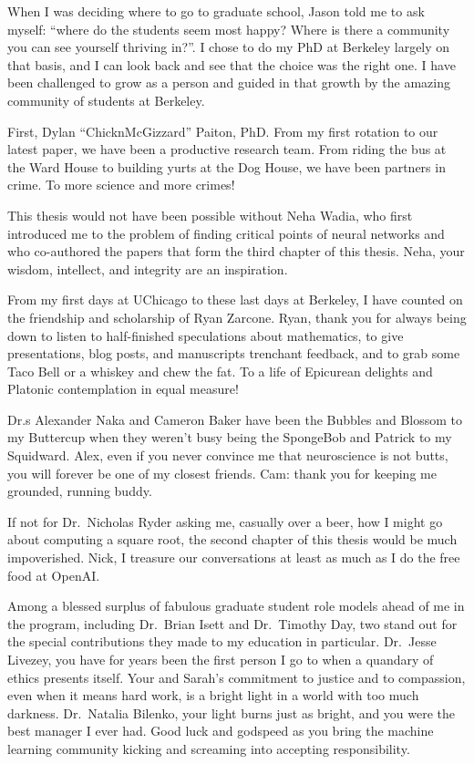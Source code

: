\begin{frontmatter}
\begin{acknowledgements}
	When I was deciding where to go to graduate school,
	Jason told me to ask myself:
	\enquote{where do the students seem most happy?
	Where is there a community you can see yourself thriving in?}.
	I chose to do my PhD at Berkeley largely on that basis,
	and I can look back and see that the choice was the right one.
	I have been challenged to grow as a person
	and guided in that growth by the amazing community
	of students at Berkeley.

	First, Dylan \enquote{ChicknMcGizzard} Paiton, PhD.
	From my first rotation to our latest paper,
	we have been a productive research team.
	From riding the bus at the Ward House
	to building yurts at the Dog House,
	we have been partners in crime.
	To more science and more crimes!

	This thesis would not have been possible
	without Neha Wadia,
	who first introduced me to the problem
	of finding critical points of neural networks
	and who co-authored the papers
	that form the third chapter of this thesis.
	Neha, your wisdom, intellect, and integrity
	are an inspiration.

	From my first days at UChicago
	to these last days at Berkeley,
	I have counted on the friendship and scholarship
	of Ryan Zarcone.
	Ryan, thank you for always being down
	to listen to half-finished speculations
	about mathematics,
	to give presentations, blog posts,
	and manuscripts trenchant feedback,
	and to grab some Taco Bell or a whiskey
	and chew the fat.
	To a life of Epicurean delights
	and Platonic contemplation
	in equal measure!

	Dr.s Alexander Naka and Cameron Baker
	have been the Bubbles and Blossom
	to my Buttercup
	when they weren't busy being
	the SpongeBob and Patrick
	to my Squidward.
	Alex, even if you never convince me
	that neuroscience is not butts,
	you will forever be one of my closest friends.
	Cam: thank you for keeping me grounded,
	running buddy.

	If not for Dr.\ Nicholas Ryder asking me,
	casually over a beer,
	how I might go about computing a square root,
	the second chapter of this thesis would be much impoverished.
	Nick, I treasure our conversations
	at least as much as I do the free food at OpenAI\@.

	Among a blessed surplus of fabulous graduate student
	role models ahead of me in the program,
	including Dr.\ Brian Isett and Dr.\ Timothy Day,
	two stand out for the special contributions they made to
	my education in particular.
	Dr.\ Jesse Livezey,
	you have for years been the first person I go to
	when a quandary of ethics presents itself.
	Your and Sarah's commitment
	to justice and to compassion,
	even when it means hard work,
	is a bright light in a world with too much darkness.
	Dr.\ Natalia Bilenko,
	your light burns just as bright,
	and you were the best manager I ever had.
	Good luck and godspeed as you bring
	the machine learning community
	kicking and screaming into
	accepting responsibility.


\end{acknowledgements}
\end{frontmatter}
